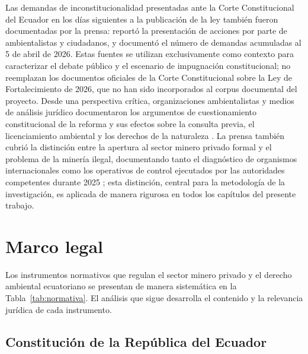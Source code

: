 Las demandas de inconstitucionalidad presentadas ante la Corte Constitucional del Ecuador en los días siguientes a la publicación de la ley también fueron documentadas por la prensa: \textcite{primicias_demanda_unagua_2026} reportó la presentación de acciones por parte de ambientalistas y ciudadanos, y \textcite{primicias_demandas_2026} documentó el número de demandas acumuladas al 5 de abril de 2026. Estas fuentes se utilizan exclusivamente como contexto para caracterizar el debate público y el escenario de impugnación constitucional; no reemplazan los documentos oficiales de la Corte Constitucional sobre la Ley de Fortalecimiento de 2026, que no han sido incorporados al corpus documental del proyecto. Desde una perspectiva crítica, organizaciones ambientalistas y medios de análisis jurídico documentaron los argumentos de cuestionamiento constitucional de la reforma y sus efectos sobre la consulta previa, el licenciamiento ambiental y los derechos de la naturaleza \parencite{revistacrisis_nueva_ley_2026,amazonfrontlines_nueva_ley_2026,lexvalor_cambios_ley_2026,primicias_registro_oficial_2026}. La prensa también cubrió la distinción entre la apertura al sector minero privado formal y el problema de la minería ilegal, documentando tanto el diagnóstico de organismos internacionales como los operativos de control ejecutados por las autoridades competentes durante 2025 \parencite{planv_mineria_criminal_2025,expreso_unodc_2025,primicias_operativos_2025,elcomercio_tasa_minera_2025}; esta distinción, central para la metodología de la investigación, es aplicada de manera rigurosa en todos los capítulos del presente trabajo.

\section{Marco legal}

Los instrumentos normativos que regulan el sector minero privado y el derecho ambiental ecuatoriano se presentan de manera sistemática en la Tabla~\ref{tab:normativa}. El análisis que sigue desarrolla el contenido y la relevancia jurídica de cada instrumento.



\subsection{Constitución de la República del Ecuador}

